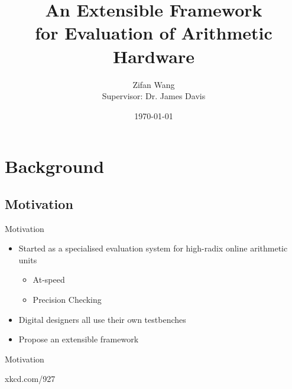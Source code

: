 \documentclass[t]{beamer}
\title[EFEAH]{An Extensible Framework\\for Evaluation of Arithmetic Hardware}
\subtitle{}
\author[Zifan Wang]{Zifan Wang \texorpdfstring{\\}{} Supervisor: Dr. James Davis}
\institute[]{Imperial College London}
\date{\today}
\begin{document}
\begin{frame}
  \titlepage
\end{frame}

\begin{frame}
  \tableofcontents
\end{frame}

\section{Background}
\subsection{Motivation}
\begin{frame}{Motivation}
  \begin{itemize}
    \item<+-> Started as a specialised evaluation system for high-radix online arithmetic units
    \begin{itemize}
      \item At-speed
      \item Precision Checking
    \end{itemize}
    \item<+-> Digital designers all use their own testbenches
    \item<+-> Propose an extensible framework
  \end{itemize}
\end{frame}

\begin{frame}{Motivation}
  \begin{figure}[H]
    \centering
  \end{figure}
  \small{xkcd.com/927}
\end{frame}
\end{document}

